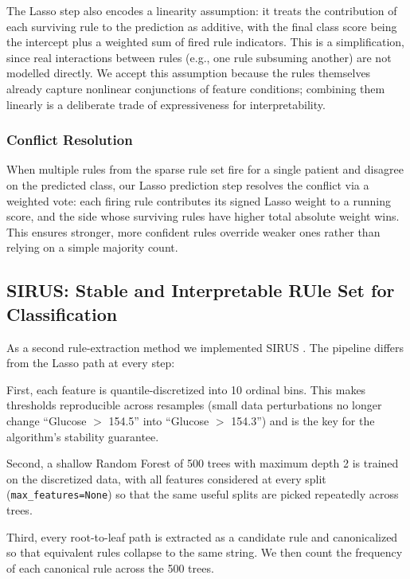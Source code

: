 \documentclass[11pt]{article}
\begin{document}
The Lasso step also encodes a linearity assumption: it treats the contribution of each surviving rule to the prediction as additive, with the final class score being the intercept plus a weighted sum of fired rule indicators. This is a simplification, since real interactions between rules (e.g., one rule subsuming another) are not modelled directly. We accept this assumption because the rules themselves already capture nonlinear conjunctions of feature conditions; combining them linearly is a deliberate trade of expressiveness for interpretability.

\subsubsection{Conflict Resolution}

When multiple rules from the sparse rule set fire for a single patient and disagree on the predicted class, our Lasso prediction step resolves the conflict via a weighted vote: each firing rule contributes its signed Lasso weight to a running score, and the side whose surviving rules have higher total absolute weight wins. This ensures stronger, more confident rules override weaker ones rather than relying on a simple majority count.

\subsection{SIRUS: Stable and Interpretable RUle Set for Classification}

As a second rule-extraction method we implemented SIRUS \citep{benard2021sirus}. The pipeline differs from the Lasso path at every step:

First, each feature is quantile-discretized into 10 ordinal bins. This makes thresholds reproducible across resamples (small data perturbations no longer change ``Glucose $>$ 154.5'' into ``Glucose $>$ 154.3'') and is the key for the algorithm's stability guarantee.

Second, a shallow Random Forest of 500 trees with maximum depth 2 is trained on the discretized data, with all features considered at every split (\texttt{max\_features=None}) so that the same useful splits are picked repeatedly across trees.

Third, every root-to-leaf path is extracted as a candidate rule and canonicalized so that equivalent rules collapse to the same string. We then count the frequency of each canonical rule across the 500 trees.
\end{document}
